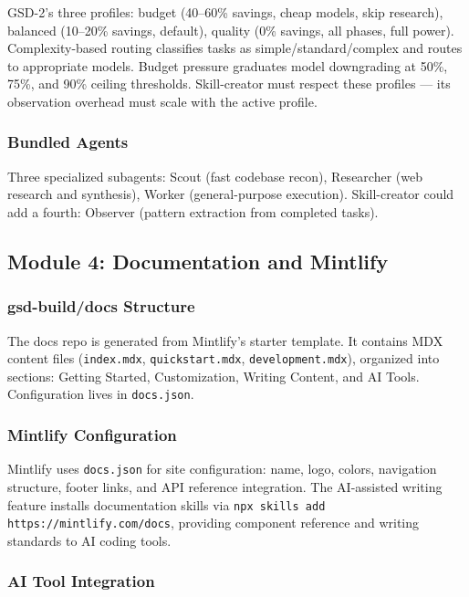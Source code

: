 \documentclass[11pt,letterpaper]{article}
\begin{document}
GSD-2's three profiles: budget (40--60\% savings, cheap models, skip research), balanced (10--20\% savings, default), quality (0\% savings, all phases, full power). Complexity-based routing classifies tasks as simple/standard/complex and routes to appropriate models. Budget pressure graduates model downgrading at 50\%, 75\%, and 90\% ceiling thresholds. Skill-creator must respect these profiles --- its observation overhead must scale with the active profile.

\subsubsection{Bundled Agents}

Three specialized subagents: Scout (fast codebase recon), Researcher (web research and synthesis), Worker (general-purpose execution). Skill-creator could add a fourth: Observer (pattern extraction from completed tasks).

\subsection{Module 4: Documentation and Mintlify}

\subsubsection{gsd-build/docs Structure}

The docs repo is generated from Mintlify's starter template. It contains MDX content files (\texttt{index.mdx}, \texttt{quickstart.mdx}, \texttt{development.mdx}), organized into sections: Getting Started, Customization, Writing Content, and AI Tools. Configuration lives in \texttt{docs.json}.

\subsubsection{Mintlify Configuration}

Mintlify uses \texttt{docs.json} for site configuration: name, logo, colors, navigation structure, footer links, and API reference integration. The AI-assisted writing feature installs documentation skills via \texttt{npx skills add https://mintlify.com/docs}, providing component reference and writing standards to AI coding tools.

\subsubsection{AI Tool Integration}
\end{document}
